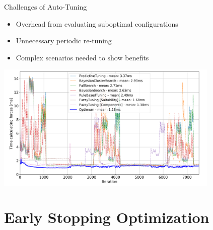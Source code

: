 \documentclass[
	10pt,
	t		%
]{beamer}
\begin{document}
\begin{frame}{Challenges of Auto-Tuning}
    \begin{itemize}
        \item Overhead from evaluating suboptimal configurations
        \item Unnecessary periodic re-tuning
        \item Complex scenarios needed to show benefits
    \end{itemize}
    \begin{center}
        \includegraphics[width=0.8\textwidth]{figures/unnecessary-tuning-phases.png}
    \end{center}
\end{frame}



\section{Early Stopping Optimization}
\end{document}
